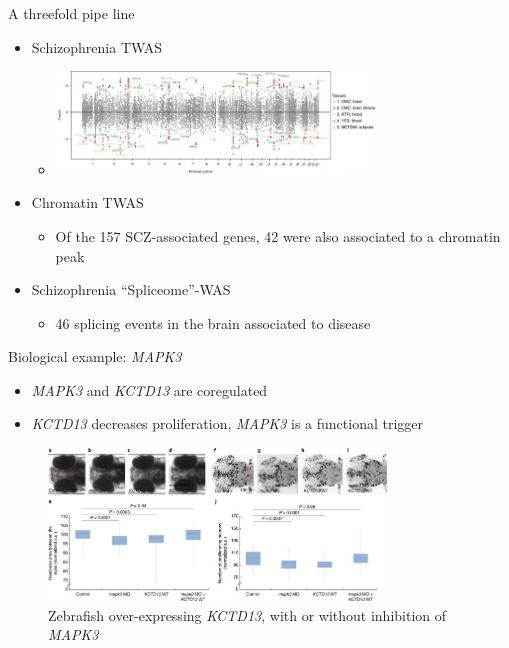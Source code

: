 \documentclass[aspectratio=169,12pt]{beamer}
\begin{document}
\begin{frame}{A threefold pipe line}

	\begin{itemize}
		\item Schizophrenia TWAS
		\begin{itemize}
			\item \includegraphics[width=0.7\textwidth]{gusev2018/2-schizophrenia_TWAS}
		\end{itemize}

		\item Chromatin TWAS
		\begin{itemize}
			\item Of the 157 SCZ-associated genes, 42 were also 
associated to a chromatin peak
		\end{itemize}

		\item Schizophrenia \enquote{Spliceome}-WAS
		\begin{itemize}
			\item 46 splicing events in the brain associated to disease
		\end{itemize}
	\end{itemize}

\end{frame}

\begin{frame}{Biological example: \textit{MAPK3}}
	
	\begin{itemize}
		\item \textit{MAPK3} and \textit{KCTD13} are coregulated
		\item \textit{KCTD13} decreases proliferation, \textit{MAPK3} is 
a functional trigger
	\end{itemize}

	\begin{figure}
		\includegraphics[width=0.8\textwidth]{gusev2018/6-zebrafish}
		\caption{Zebrafish over-expressing \textit{KCTD13}, with or 
without inhibition of \textit{MAPK3}}
	\end{figure}


\end{frame}
\end{document}
